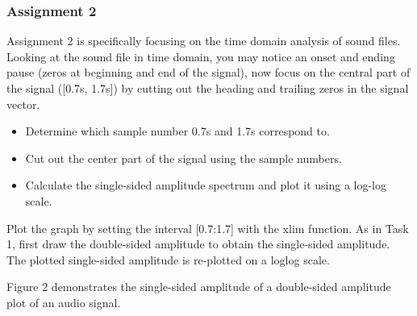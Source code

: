 \documentclass[
	a4paper,
	11pt,
]{article}
\begin{document}
\subsubsection{Assignment 2}
Assignment 2 is specifically focusing on the time domain analysis of sound files. Looking at the sound file in time domain, you may notice an onset and ending pause (zeros at beginning and end of the signal), now focus on the central part of the signal ([0.7s, 1.7s]) by cutting out the heading and trailing zeros in the signal vector.\\


\begin{itemize}
\item Determine which sample number 0.7s and 1.7s correspond to.
\item Cut out the center part of the signal using the sample numbers.
\item Calculate the single-sided amplitude spectrum and plot it using a log-log scale.

\end{itemize}

Plot the graph by setting the interval [0.7:1.7] with the xlim function. As in Task 1, first draw the double-sided amplitude to obtain the single-sided amplitude. The plotted single-sided amplitude is re-plotted on a loglog scale.

Figure 2 demonstrates the single-sided amplitude of a double-sided amplitude plot of an audio signal.
\end{document}
